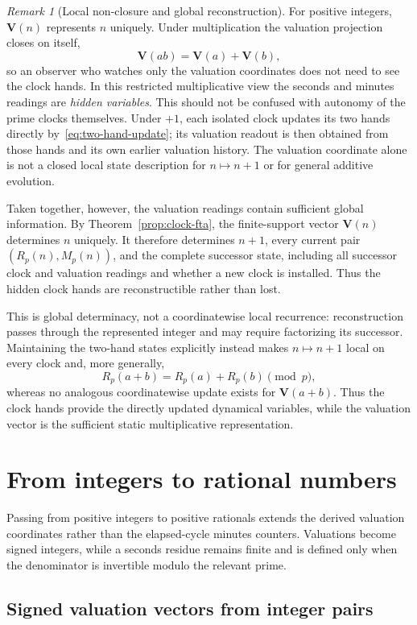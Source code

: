\documentclass[11pt,a4paper]{article}
\theoremstyle{clockplain}
\theoremstyle{definition}
\theoremstyle{remark}
\newtheorem{remark}[proposition]{Remark}
\newcommand{\V}{\mathbf V}
\begin{document}
\begin{remark}[Local non-closure and global reconstruction]
\label{rem:global-reconstruction}
For positive integers, $\V(n)$ represents $n$ uniquely. Under multiplication the valuation projection closes on itself,
\[
\V(ab)=\V(a)+\V(b),
\]
so an observer who watches only the valuation coordinates does not need to see the clock hands. In this restricted multiplicative view the seconds and minutes readings are \emph{hidden variables}. This should not be confused with autonomy of the prime clocks themselves. Under $+1$, each isolated clock updates its two hands directly by~\eqref{eq:two-hand-update}; its valuation readout is then obtained from those hands and its own earlier valuation history. The valuation coordinate alone is not a closed local state description for $n\mapsto n+1$ or for general additive evolution.

Taken together, however, the valuation readings contain sufficient global information. By Theorem~\ref{prop:clock-fta}, the finite-support vector $\V(n)$ determines $n$ uniquely. It therefore determines $n+1$, every current pair $(R_p(n),M_p(n))$, and the complete successor state, including all successor clock and valuation readings and whether a new clock is installed. Thus the hidden clock hands are reconstructible rather than lost.

This is global determinacy, not a coordinatewise local recurrence: reconstruction passes through the represented integer and may require factorizing its successor. Maintaining the two-hand states explicitly instead makes $n\mapsto n+1$ local on every clock and, more generally,
\[
R_p(a+b)=R_p(a)+R_p(b)\pmod p,
\]
whereas no analogous coordinatewise update exists for $\V(a+b)$. Thus the clock hands provide the directly updated dynamical variables, while the valuation vector is the sufficient static multiplicative representation.
\end{remark}

\section{From integers to rational numbers}

Passing from positive integers to positive rationals extends the derived valuation coordinates rather than the elapsed-cycle minutes counters. Valuations become signed integers, while a seconds residue remains finite and is defined only when the denominator is invertible modulo the relevant prime.

\subsection{Signed valuation vectors from integer pairs}
\end{document}
